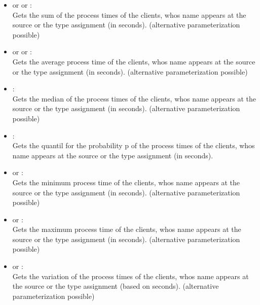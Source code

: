\begin{itemize}

\item
{} or  or :\\
Gets the sum of the process times of the clients, whos name appears at the source or the type assignment  (in seconds).
(alternative parameterization possible)

\item
{} or  or :\\
Gets the average process time of the clients, whos name appears at the source or the type assignment  (in seconds).
(alternative parameterization possible)

\item
{}:\\
Gets the median of the process times of the clients, whos name appears at the source or the type assignment  (in seconds).
(alternative parameterization possible)

\item
{}:\\
Gets the quantil for the probability p of the process times of the clients, whos name appears at the source or the type assignment  (in seconds).

\item
{} or :\\
Gets the minimum process time of the clients, whos name appears at the source or the type assignment  (in seconds).
(alternative parameterization possible)

\item
{} or :\\
Gets the maximum process time of the clients, whos name appears at the source or the type assignment  (in seconds).
(alternative parameterization possible)

\item
{} or :\\
Gets the variation of the process times of the clients, whos name appears at the source or the type assignment  (based on seconds).
(alternative parameterization possible)


\end{itemize}
